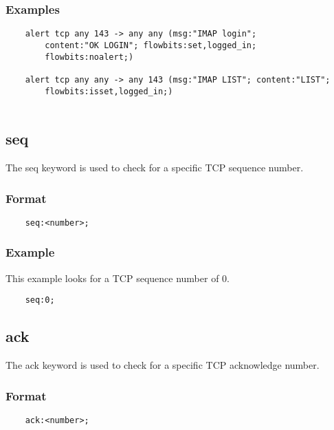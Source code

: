 \documentclass[english]{report}
\begin{document}
\subsubsection{Examples}

\begin{verbatim}
    alert tcp any 143 -> any any (msg:"IMAP login"; 
        content:"OK LOGIN"; flowbits:set,logged_in; 
        flowbits:noalert;)
      
    alert tcp any any -> any 143 (msg:"IMAP LIST"; content:"LIST"; 
        flowbits:isset,logged_in;)
	
\end{verbatim}

\subsection{seq}

The seq keyword is used to check for a specific TCP sequence number.

\subsubsection{Format}

\begin{verbatim}
    seq:<number>;
\end{verbatim}

\subsubsection{Example}

This example looks for a TCP sequence number of 0.

\begin{verbatim}
    seq:0;
\end{verbatim}

\subsection{ack}

The ack keyword is used to check for a specific TCP acknowledge number.

\subsubsection{Format}

\begin{verbatim}
    ack:<number>;
\end{verbatim}
\end{document}
